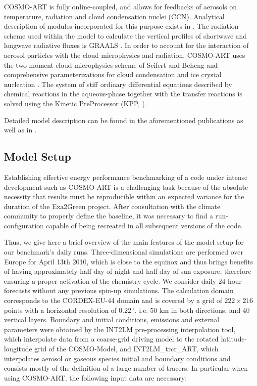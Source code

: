 COSMO-ART  is  fully  online-coupled,  and  allows  for  feedbacks  of
aerosols  on  temperature,  radiation  and cloud  condensation  nuclei
(CCN).   Analytical  description  of  modules  incorporated  for  this
purpose  exists in  \citep{Vogel-2009,  Bangert-2011}.  The  radiation
scheme used  within the  model to calculate  the vertical  profiles of
shortwave and longwave radiative fluxes is GRAALS \citep{Ritter-1992}.
In order to account for  the interaction of aerosol particles with the
cloud microphysics and radiation,  COSMO-ART uses the two-moment cloud
microphysics  scheme of  Seifert and  Beheng  \citep{Seifert-2006} and
comprehensive parameterizations for cloud condensation and ice crystal
nucleation  \citep{Bangert-2011, Bangert-2012}.   The system  of stiff
ordinary differential equations described by chemical reactions in the
aqueous-phase together with the transfer reactions is solved using the
Kinetic PreProcessor (KPP, \citealp{Damian-2002}).

Detailed  model  description  can   be  found  in  the  aforementioned
publications  as   well  as  in   \citep{Stanelle-2010,  Bangert-2012,
  Knote-2011, Knote-2013}.

\subsection{Model Setup}
\label{subsec:1.2}
Establishing effective energy performance benchmarking of a code under
intense development such as COSMO-ART is a challenging task because of
the  absolute necessity that  results must  be reproducible  within an
expected  variance for the  duration of  the Exa2Green  project. After
consultation  with  the  climate  community  to  properly  define  the
baseline,  it was  necessary to  find a  run-configuration  capable of
being recreated in all subsequent versions of the code.

Thus, we give here a brief  overview of the main features of the model
setup for  our benchmark's daily  runs.  Three-dimensional simulations
are performed over  Europe for April 13th 2010, which  is close to the
equinox and thus  brings benefits of having approximately  half day of
night  and half  day  of  sun exposure,  therefore  ensuring a  proper
activation of the chemistry cycle. We consider daily 24-hour forecasts
without  any  previous spin-up  simulations.   The calculation  domain
corresponds to  the CORDEX-EU-44  domain and is  covered by a  grid of
$222\times   216$    points   with   a    horizontal   resolution   of
$0.22\,^{\circ}$,  i.e.  50  km in  both directions,  and  40 vertical
layers.   Boundary  and  initial  conditions, emissions  and  external
parameters  were obtained by  the INT2LM  pre-processing interpolation
tool, which interpolate  data from a coarse-grid driving  model to the
rotated    latitude-longitude   grid    of   the    COSMO-Model,   and
INT2LM\_trcr\_ART,  which  interpolates  aerosol  or  gaseous  species
initial and boundary conditions  and consists mostly of the definition
of a large number of  tracers. In particular when using COSMO-ART, the
following input data are necessary:

